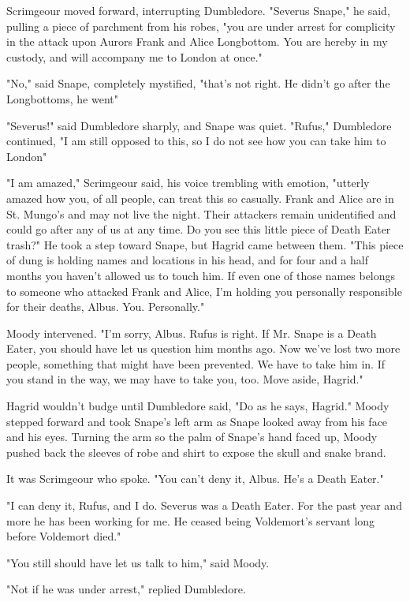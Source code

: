 Scrimgeour moved forward, interrupting Dumbledore. "Severus Snape," he said, pulling a piece of parchment from his robes, "you are under arrest for complicity in the attack upon Aurors Frank and Alice Longbottom. You are hereby in my custody, and will accompany me to London at once."

"No," said Snape, completely mystified, "that's not right. He didn't go after the Longbottoms, he went{\el}"

"Severus!" said Dumbledore sharply, and Snape was quiet. "Rufus," Dumbledore continued, "I am still opposed to this, so I do not see how you can take him to London{\el}"

"I am amazed," Scrimgeour said, his voice trembling with emotion, "utterly amazed how you, of all people, can treat this so casually. Frank and Alice are in St. Mungo's and may not live the night. Their attackers remain unidentified and could go after any of us at any time. Do you see this little piece of Death Eater trash?" He took a step toward Snape, but Hagrid came between them. "This piece of dung is holding names and locations in his head, and for four and a half months you haven't allowed us to touch him. If even one of those names belongs to someone who attacked Frank and Alice, I'm holding you personally responsible for their deaths, Albus. You. Personally."

Moody intervened. "I'm sorry, Albus. Rufus is right. If Mr. Snape is a Death Eater, you should have let us question him months ago. Now we've lost two more people, something that might have been prevented. We have to take him in. If you stand in the way, we may have to take you, too. Move aside, Hagrid."

Hagrid wouldn't budge until Dumbledore said, "Do as he says, Hagrid." Moody stepped forward and took Snape's left arm as Snape looked away from his face and his eyes. Turning the arm so the palm of Snape's hand faced up, Moody pushed back the sleeves of robe and shirt to expose the skull and snake brand.

It was Scrimgeour who spoke. "You can't deny it, Albus. He's a Death Eater."

"I can deny it, Rufus, and I do. Severus was a Death Eater. For the past year and more he has been working for me. He ceased being Voldemort's servant long before Voldemort died."

"You still should have let us talk to him," said Moody.

"Not if he was under arrest," replied Dumbledore.

